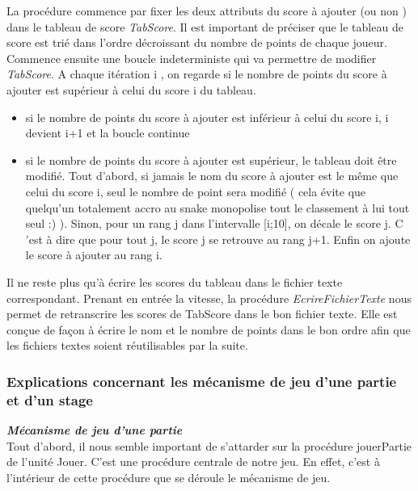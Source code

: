 \documentclass[11pt,a4paper]{article}
\begin{document}
La procédure commence par fixer les deux attributs du score à ajouter (ou non ) dans le tableau de score \textit{TabScore}. Il est important de préciser que le tableau de score est trié dans l'ordre décroissant du nombre de points de chaque joueur. Commence ensuite une boucle indeterministe qui va permettre de modifier \textit{TabScore}. A chaque itération i , on regarde si le nombre de points du score à ajouter est supérieur à celui du score i du tableau. 

\begin{itemize}
 \item si le nombre de points du score à ajouter est inférieur à celui du score i, i devient i+1 et la boucle continue
 \item si le nombre de points du score à ajouter est supérieur, le tableau doit être modifié. Tout d'abord, si jamais le nom du score à ajouter est le même que celui du score i, seul le nombre de point sera modifié ( cela évite que quelqu'un totalement accro au snake monopolise tout le classement à lui tout seul :) ). Sinon, pour un rang j dans l'intervalle [i;10], on décale le score j. C 'est à dire que pour tout j, le score j se retrouve au rang j+1. Enfin on ajoute le score à ajouter au rang i.
\end{itemize}

Il ne reste plus qu'à écrire les scores du tableau dans le fichier texte correspondant. Prenant en entrée la vitesse, la procédure \textit{EcrireFichierTexte} nous permet de retranscrire les scores de TabScore dans le bon fichier texte. Elle est conçue de façon à écrire le nom et le nombre de points dans le bon ordre afin que les fichiers textes soient réutilisables par la suite.

        \subsubsection{Explications concernant les mécanisme de jeu d'une partie et d'un stage}
        
        \textit{\textbf{Mécanisme de jeu d'une partie}}\\
        
        Tout d’abord, il nous semble important de s’attarder sur la procédure jouerPartie de l’unité Jouer. C’est une procédure centrale de notre jeu. En effet, c’est à l’intérieur de cette procédure que se déroule le mécanisme de jeu. 
        
\end{document}
